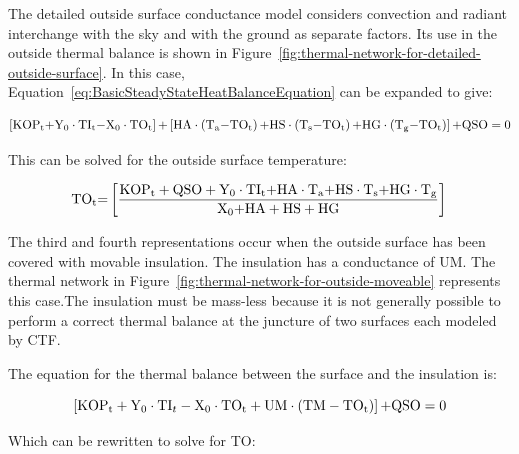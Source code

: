 The detailed outside surface conductance model considers convection and radiant interchange with the sky and with the ground as separate factors. Its use in the outside thermal balance is shown in Figure~\ref{fig:thermal-network-for-detailed-outside-surface}. In this case, Equation~\ref{eq:BasicSteadyStateHeatBalanceEquation} can be expanded to give:

\begin{equation}
\left[ {{\rm{KO}}{{\rm{P}}_{\rm{t}}}{\rm{ + }}{{\rm{Y}}_{\rm{0}}}\cdot {\rm{T}}{{\rm{I}}_{\rm{t}}}{\rm{ - }}{{\rm{X}}_{\rm{0}}}\cdot {\rm{T}}{{\rm{O}}_{\rm{t}}}} \right]{\rm{ + }}\left[ {{\rm{HA}}\cdot \left( {{{\rm{T}}_{\rm{a}}}{\rm{ - T}}{{\rm{O}}_{\rm{t}}}} \right){\rm{ + HS}}\cdot \left( {{{\rm{T}}_{\rm{s}}}{\rm{ - T}}{{\rm{O}}_{\rm{t}}}} \right){\rm{ + HG}}\cdot \left( {{{\rm{T}}_{\rm{g}}}{\rm{ - T}}{{\rm{O}}_{\rm{t}}}} \right)} \right]{\rm{  + QSO  =  0  }}
\label{eq:MoreDetailedOutsideSurfHeatBalEq}
\end{equation}

This can be solved for the outside surface temperature:

\begin{equation}
{\rm{T}}{{\rm{O}}_{\rm{t}}}{\rm{ = }}\left[ {\frac{{{\rm{KO}}{{\rm{P}}_{\rm{t}}} + {\rm{QSO}} + {{\rm{Y}}_0}\cdot {\rm{T}}{{\rm{I}}_{\rm{t}}}{\rm{ + HA}}\cdot {{\rm{T}}_{\rm{a}}}{\rm{ + HS}}\cdot {{\rm{T}}_{\rm{s}}}{\rm{ + HG}}\cdot {{\rm{T}}_{\rm{g}}}}}{{{{\rm{X}}_{\rm{0}}}{\rm{ + HA + HS + HG}}}}} \right]{\rm{  }}
\end{equation}

The third and fourth representations occur when the outside surface has been covered with movable insulation. The insulation has a conductance of UM. The thermal network in Figure~\ref{fig:thermal-network-for-outside-moveable} represents this case.The insulation must be mass-less because it is not generally possible to perform a correct thermal balance at the juncture of two surfaces each modeled by CTF.

The equation for the thermal balance between the surface and the insulation is:

\begin{equation}
\left[ {{\rm{KO}}{{\rm{P}}_{\rm{t}}} + {{\rm{Y}}_{\rm{0}}}\cdot {\rm{T}}{{\rm{I}}_t} - {{\rm{X}}_{\rm{0}}}\cdot {\rm{T}}{{\rm{O}}_{\rm{t}}} + {\rm{UM}}\cdot \left( {{\rm{TM - T}}{{\rm{O}}_{\rm{t}}}} \right)} \right]{\rm{ + QSO  =  0}}
\end{equation}

Which can be rewritten to solve for TO:

